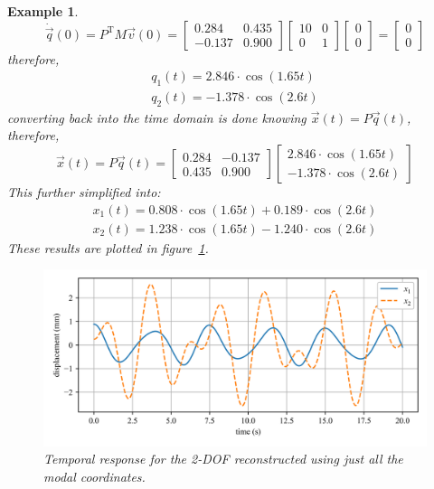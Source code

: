 \documentclass[12pt,letter]{article}
\newtheorem{ex}{Example}
\numberwithin{ex}{section} %
\newenvironment{example}{\begin{mdframed}[middlelinewidth=0.5mm]\begin{ex}\normalfont}{\end{ex}\end{mdframed}}
\numberwithin{re}{section} %
\begin{document}
\begin{example}
\begin{equation}
\end{equation}
\begin{equation}
\dot{\vec{q}}(0) = P^\text{T} M \vec{v}(0) = \begin{bmatrix} 0.284 &  0.435 \\  -0.137    & 0.900 \end{bmatrix} \begin{bmatrix} 10 & 0 \\  0  & 1 \end{bmatrix}  \begin{bmatrix} 0 \\  0 \end{bmatrix} =  \begin{bmatrix}  0 \\  0 \end{bmatrix}
\end{equation}
therefore, 
\begin{eqnarray}
q_1(t) = 2.846 \cdot \cos (1.65 t) \\ 
q_2(t) = -1.378 \cdot \cos (2.6 t)  \nonumber
\label{eq:participation}
\end{eqnarray}
converting back into the time domain is done knowing $\vec{x}(t) = P\vec{q}(t)$, therefore, 
\begin{equation}
\vec{x}(t) = P\vec{q}(t) = \begin{bmatrix} 0.284 & -0.137 \\    0.435  & 0.900 \end{bmatrix}  \begin{bmatrix} 2.846 \cdot \cos (1.65 t) \\  -1.378 \cdot \cos (2.6 t) \end{bmatrix}
\end{equation}
This further simplified into:
\begin{eqnarray}
x_1(t) = 0.808 \cdot \cos (1.65 t) + 0.189 \cdot \cos (2.6 t) \\ 
x_2(t) = 1.238 \cdot \cos (1.65 t) - 1.240 \cdot \cos (2.6 t)  \nonumber
\end{eqnarray}
These results are plotted in figure~\ref{fig:modal_analysis_free_vibration}.
\begin{figure}[H]
	\centering
	\includegraphics[width=\linewidth]{../Figures/modal_analysis_free_vibration.png}
	\caption{Temporal response for the 2-DOF reconstructed using just all the modal coordinates.}
	\label{fig:modal_analysis_free_vibration}
\end{figure}


\end{example}
\end{document}
